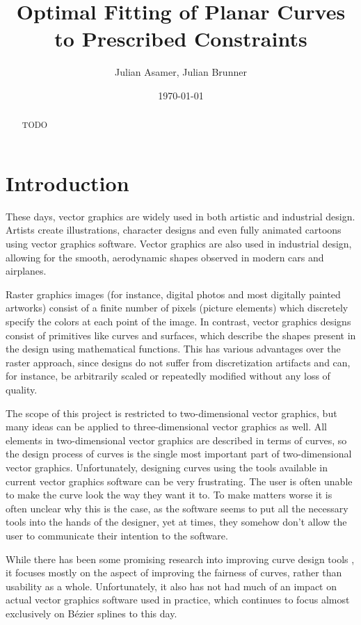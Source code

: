 \documentclass[a4paper]{article}
\title{Optimal Fitting of Planar Curves to Prescribed Constraints}
\author{Julian Asamer, Julian Brunner}
\date{\today}
\begin{document}
	\maketitle

	\begin{abstract}

		\noindent TODO

	\end{abstract}

	\section{Introduction}
	\label{section:introduction}

		These days, vector graphics are widely used in both artistic and industrial design. Artists create illustrations, character designs and even fully animated cartoons using vector graphics software. Vector graphics are also used in industrial design, allowing for the smooth, aerodynamic shapes observed in modern cars and airplanes.

		Raster graphics images (for instance, digital photos and most digitally painted artworks) consist of a finite number of pixels (picture elements) which discretely specify the colors at each point of the image. In contrast, vector graphics designs consist of primitives like curves and surfaces, which describe the shapes present in the design using mathematical functions. This has various advantages over the raster approach, since designs do not suffer from discretization artifacts and can, for instance, be arbitrarily scaled or repeatedly modified without any loss of quality.

		The scope of this project is restricted to two-dimensional vector graphics, but many ideas can be applied to three-dimensional vector graphics as well. All elements in two-dimensional vector graphics are described in terms of curves, so the design process of curves is the single most important part of two-dimensional vector graphics. Unfortunately, designing curves using the tools available in current vector graphics software can be very frustrating. The user is often unable to make the curve look the way they want it to. To make matters worse it is often unclear why this is the case, as the software seems to put all the necessary tools into the hands of the designer, yet at times, they somehow don't allow the user to communicate their intention to the software.

		While there has been some promising research into improving curve design tools \cite{thesis-mvc} \cite{thesis-spiro}, it focuses mostly on the aspect of improving the fairness of curves, rather than usability as a whole. Unfortunately, it also has not had much of an impact on actual vector graphics software used in practice, which continues to focus almost exclusively on Bézier splines to this day.
\end{document}
